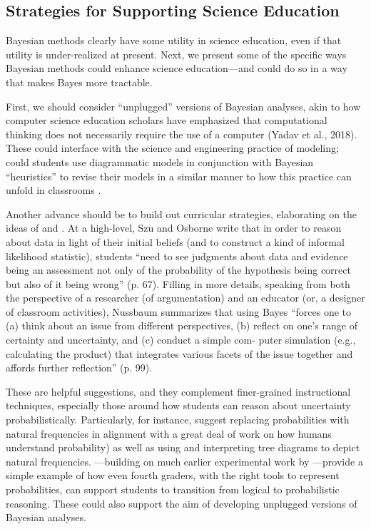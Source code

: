 \documentclass[man]{apa7}
\begin{document}
\subsection{Strategies for Supporting Science Education}

Bayesian methods clearly have some utility in science education, even if that utility is under-realized at present. Next, we present some of the specific ways Bayesian methods could enhance science education—and could do so in a way that makes Bayes more tractable.

First, we should consider ``unplugged'' versions of Bayesian analyses, akin to how computer science education scholars have emphasized that computational thinking does not necessarily require the use of a computer (Yadav et al., 2018). These could interface with the science and engineering practice of modeling; could students use diagrammatic models in conjunction with Bayesian “heuristics” to revise their models in a similar manner to how this practice can unfold in classrooms \parencite{schwarz2009developing}. 

Another advance should be to build out curricular strategies, elaborating on the ideas of \textcite{so12} and \textcite{n11}. At a high-level, Szu and Osborne write that in order to reason about data in light of their initial beliefs (and to construct a kind of informal likelihood statistic), students “need to see judgments about data and evidence being an assessment not only of the probability of the hypothesis being correct but also of it being wrong” (p. 67). Filling in more details, speaking from both the perspective of a researcher (of argumentation) and an educator (or, a designer of classroom activities), Nussbaum summarizes that using Bayes “forces one to (a) think about an issue from different perspectives, (b) reflect on one’s range of certainty and uncertainty, and (c) conduct a simple com- puter simulation (e.g., calculating the product) that integrates various facets of the issue together and affords further reflection” (p. 99). 

These are helpful suggestions, and they complement finer-grained instructional techniques, especially those around how students can reason about uncertainty probabilistically. Particularly, \textcite{bkbm18} for instance, suggest replacing probabilities with natural frequencies in alignment with a great deal of work on how humans understand probability) \parencite{gh95} as well as using and interpreting tree diagrams to depict natural frequencies. \textcite{me14}—building on much earlier experimental work by \textcite{wason1971natural}—provide a simple example of how even fourth graders, with the right tools to represent probabilities, can support students to transition from logical to probabilistic reasoning. These could also support the aim of developing unplugged versions of Bayesian analyses. 
\end{document}

